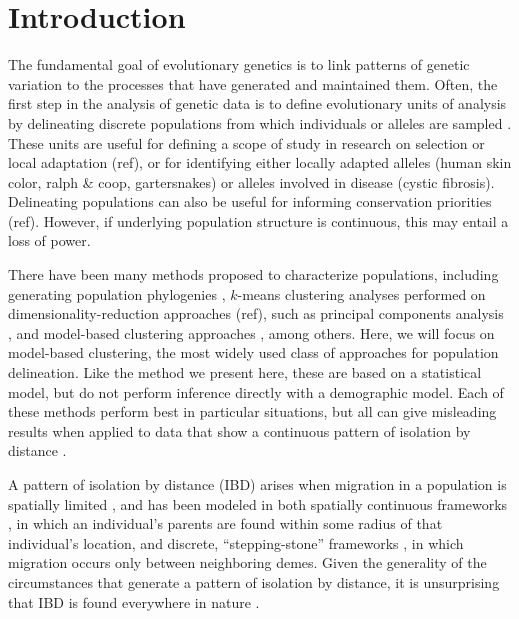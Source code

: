 \documentclass[12pt]{article}
\begin{document}


\newpage
\section*{Introduction}
The fundamental goal of evolutionary genetics is to link patterns of genetic variation 
to the processes that have generated and maintained them.
Often, the first step in the analysis of genetic data is to define evolutionary units of analysis
by delineating discrete populations from which individuals or alleles are sampled \citep{wright1949genetical}.
These units are useful for defining a scope of study in research on selection or local adaptation (ref),
or for identifying either locally adapted alleles (human skin color, ralph \& coop, gartersnakes) or alleles involved in disease (cystic fibrosis).
Delineating populations can also be useful for informing conservation priorities (ref).
However, if underlying population structure is continuous, this may entail a loss of power.

There have been many methods proposed to characterize populations,
including generating population phylogenies \citep{CavalliSforza1975, treemix},
$k$-means clustering analyses performed on dimensionality-reduction approaches (ref), 
such as principal components analysis \citep{menozzi1978synthetic,novembre_interpreting_2008, price2006eigenstrat},
and model-based clustering approaches \citep[e.g.][]{STRUCTURE, falush2003, hubisz2009,ADMIXTURE, FINESTRUCTURE, huelsenbeck2007inference, Corander2003,TESS,geneland}, among others.
Here, we will focus on model-based clustering, the most widely used class of approaches for population delineation.
Like the method we present here, these are based on a statistical model,
but do not perform inference directly with a demographic model.
Each of these methods perform best in particular situations,
but all can give misleading results when applied to data that show a continuous pattern of isolation by distance 
\citep{Wright1943, novembre_interpreting_2008, Frantz2009}.

A pattern of isolation by distance (IBD) arises when migration in a population is spatially limited \citep{Slatkin1985},
and has been modeled in both spatially continuous frameworks \citep{Wright1943,malecot1969mathematics}, 
in which an individual's parents are found within some radius of that individual's location,
and discrete, ``stepping-stone'' frameworks \citep{kimura1964stepping},
in which migration occurs only between neighboring demes.
Given the generality of the circumstances that generate a pattern of isolation by distance, 
it is unsurprising that IBD is found everywhere in nature \citep{meirmans2012,Sexton_etal_2014}.
\end{document}
